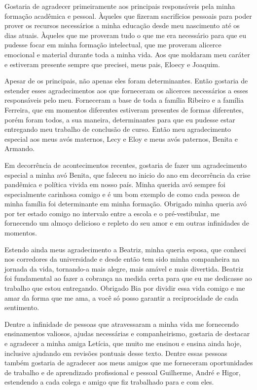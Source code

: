 Gostaria de agradecer primeiramente aos principais responsáveis pela minha formação acadêmica e pessoal. Àqueles que fizeram sacrifícios pessoais para poder prover os recursos necessários a minha educação desde meu nascimento até os dias atuais. Àqueles que me proveram tudo o que me era necessário para que eu pudesse focar em minha formação intelectual, que me proveram alicerce emocional e material durante toda a minha vida. Aos que moldaram meu caráter e estiveram presente sempre que precisei, meus pais, Eloecy e Joaquim. 

Apesar de os principais, não apenas eles foram determinantes. Então gostaria de estender esses agradecimentos aos que forneceram os alicerces necessários a esses responsáveis pelo meu. Forneceram a base de toda a família Ribeiro e a família Ferreira, que em momentos diferentes estiveram presentes de formas diferentes, porém foram todos, a sua maneira, determinantes para que eu pudesse estar entregando meu trabalho de conclusão de curso. Então meu agradecimento especial aos meus avós maternos, Lecy e Eloy e meus avós paternos, Benita e Armando.

Em decorrência de acontecimentos recentes, gostaria de fazer um agradecimento especial a minha avó Benita, que faleceu no inicio do ano em decorrência da crise pandêmica e política vivida em nosso país. Minha querida avó sempre foi especialmente carinhosa comigo e é um bom exemplo de como cada pessoa de minha família foi determinante em minha formação. Obrigado minha queria avó por ter estado comigo no intervalo entre a escola e o pré-vestibular, me fornecendo um almoço delicioso e repleto do seu amor e em outras infinidades de momentos.

Estendo ainda meus agradecimento a Beatriz, minha queria esposa, que conheci nos corredores da universidade e desde então tem sido minha companheira na jornada da vida, tornando-a mais alegre, mais amável e mais divertida. Beatriz foi fundamental ao fazer a cobrança na medida certa para que eu me dedicasse ao trabalho que estou entregando. Obrigado Bia por dividir essa vida comigo e me amar da forma que me ama, a você só posso garantir a reciprocidade de cada sentimento.

Dentre a infinidade de pessoas que atravessaram a minha vida me fornecendo ensinamentos valiosos, ajudas necessárias e companheirismo, gostaria de destacar e agradecer a minha amiga Letícia, que muito me ensinou e ensina ainda hoje, inclusive ajudando em revisões pontuais desse texto. Dentre essas pessoas também gostaria de agradecer aos meus amigos que me forneceram oportunidades de trabalho e de aprendizado profissional e pessoal Guilherme, André e Higor, estendendo a cada colega e amigo que fiz trabalhado para e com eles.

